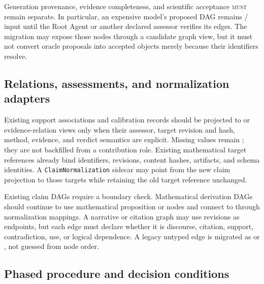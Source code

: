Generation provenance, evidence completeness, and scientific acceptance \textsc{must} remain separate. In particular, an expensive model's proposed DAG remains / input until the Root Agent or another declared assessor verifies its edges. The migration may expose those nodes through a candidate graph view, but it must not convert oracle proposals into accepted \ClaimRelation{} objects merely because their identifiers resolve.

\subsection{Relations, assessments, and normalization adapters}

Existing support associations and calibration records should be projected to \ClaimAssessment{} or evidence-relation views only when their assessor, target revision and hash, method, evidence, and verdict semantics are explicit. Missing values remain ; they are not backfilled from a contribution role. Existing mathematical target references already bind identifiers, revisions, content hashes, artifacts, and schema identities. A \texttt{ClaimNormalization} sidecar may point from the new claim projection to those targets while retaining the old target reference unchanged.

Existing claim DAGs require a boundary check. Mathematical derivation DAGs should continue to use mathematical proposition or \MathClaimIR{} nodes and connect to \ScientificClaim{} through normalization mappings. A narrative or citation graph may use \ScientificClaim{} revisions as endpoints, but each edge must declare whether it is discourse, citation, support, contradiction, use, or logical dependence. A legacy untyped edge is migrated as  or , not guessed from node order.

\subsection{Phased procedure and decision conditions}

